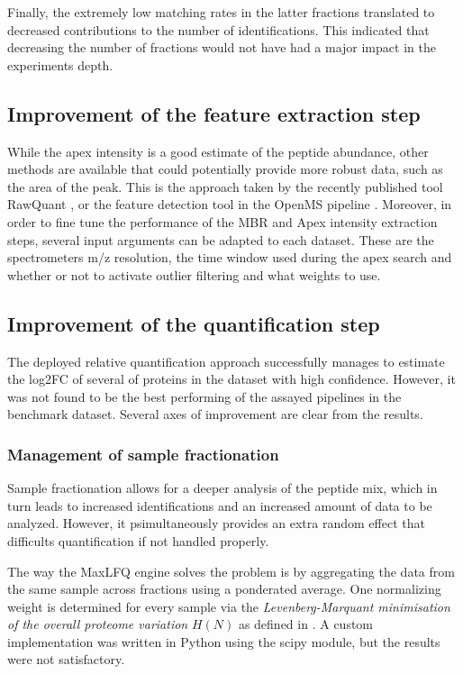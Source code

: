 Finally, the extremely low matching rates in the latter fractions translated to decreased contributions to the number of identifications. This indicated that decreasing the number of fractions would not have had a major impact in the experiment\textquotesingle s depth.

\subsection{Improvement of the feature extraction step}

While the apex intensity is a good estimate of the peptide abundance, other methods are available that could potentially provide more robust data, such as the area of the peak. This is the approach taken by the recently published tool RawQuant \cite{Kovalchik2018}, or the feature detection tool in the OpenMS pipeline \cite{Sturm2008}. Moreover, in order to fine tune the performance of the \ac{MBR} and Apex intensity extraction steps, several input arguments can be adapted to each dataset. These are the spectrometer\textquotesingle s \ac{m/z} resolution, the time window used during the apex search and whether or not to activate outlier filtering and what weights to use.

\subsection{Improvement of the quantification step}

The deployed relative quantification approach successfully manages to estimate the \ac{log2FC} of several of proteins in the dataset with high confidence. However, it was not found to be the best performing of the assayed pipelines in the benchmark dataset. Several axes of improvement are clear from the results.

\subsubsection{Management of sample fractionation}

Sample fractionation allows for a deeper analysis of the peptide mix, which in turn leads to increased identifications and an increased amount of data to be analyzed. However, it psimultaneously provides an extra random effect that difficults quantification if not handled properly.

The way the MaxLFQ engine solves the problem is by aggregating the data from the same sample across fractions using a ponderated average. One normalizing weight is determined for every sample via the \textit{Levenberg-Marquant minimisation of the overall proteome variation} $H(N)$ as defined in \cite{Cox2014}. A custom implementation was written in Python using the scipy module, but the results were not satisfactory.

